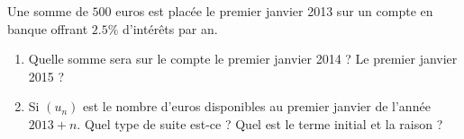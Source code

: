 
\begin{exercice}\label{exosmath-0302}

    Une somme de \( 500\) euros est placée le premier janvier 2013 sur un compte en banque offrant \( 2.5\%\) d'intérêts par an. 
    \begin{enumerate}
        \item
            Quelle somme sera sur le compte le premier janvier 2014 ? Le premier janvier 2015 ?
        \item
            Si \( (u_n)\) est le nombre d'euros disponibles au premier janvier de l'année \( 2013+n\). Quel type de suite est-ce ? Quel est le terme initial et la raison ?
    \end{enumerate}

\end{exercice}
